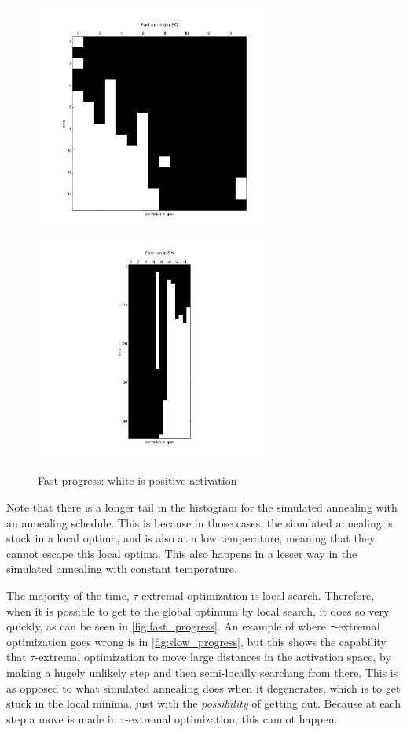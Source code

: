 \documentclass[12pt]{article}
\begin{document}
\begin{figure}
  \label{fig:fast_progess}
  \includegraphics[width=3in]{eo_fast}
  \includegraphics[width=3in]{sa_fast}
  \caption{Fast progress: white is positive activation}
\end{figure}

Note that there is a longer tail in the histogram for the simulated annealing with an annealing schedule. This is because in those cases, the simulated annealing is stuck in a local optima, and is also at a low temperature, meaning that they cannot escape this local optima. This also happens in a lesser way in the simulated annealing with constant temperature.

The majority of the time, $\tau$-extremal optimization is local search. Therefore, when it is possible to get to the global optimum by local search, it does so very quickly, as can be seen in \ref{fig:fast_progress}. An example of where $\tau$-extremal optimization goes wrong is in \ref{fig:slow_progress}, but this shows the capability that $\tau$-extremal optimization to move large distances in the activation space, by making a hugely unlikely step and then semi-locally searching from there. This is as opposed to what simulated annealing does when it degenerates, which is to get stuck in the local minima, just with the \emph{possibility} of getting out. Because at each step a move is made in $\tau$-extremal optimization, this cannot happen.
\end{document}
